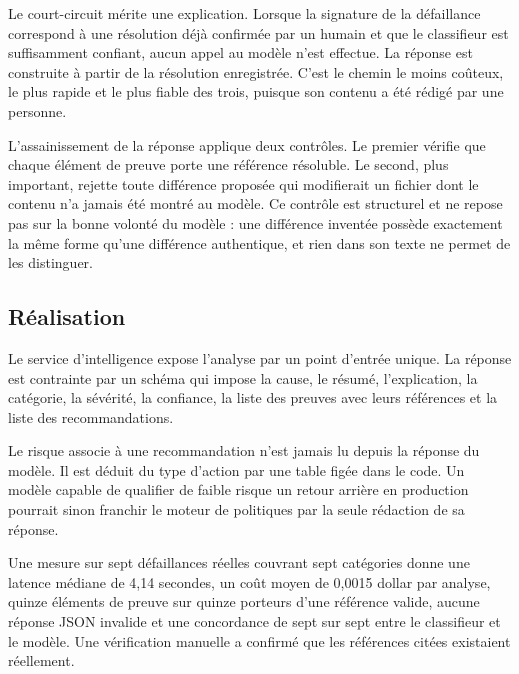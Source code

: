\documentclass[12pt,a4paper,oneside]{report}
\begin{document}
Le court-circuit mérite une explication. Lorsque la signature de la défaillance
correspond à une résolution déjà confirmée par un humain et que le classifieur
est suffisamment confiant, aucun appel au modèle n'est effectue. La réponse est
construite à partir de la résolution enregistrée. C'est le chemin le moins
coûteux, le plus rapide et le plus fiable des trois, puisque son contenu a été
rédigé par une personne.

L'assainissement de la réponse applique deux contrôles. Le premier vérifie que
chaque élément de preuve porte une référence résoluble. Le second, plus
important, rejette toute différence proposée qui modifierait un fichier dont le
contenu n'a jamais été montré au modèle. Ce contrôle est structurel et ne repose
pas sur la bonne volonté du modèle : une différence inventée possède exactement
la même forme qu'une différence authentique, et rien dans son texte ne permet de
les distinguer.

\subsection{Réalisation}

Le service d'intelligence expose l'analyse par un point d'entrée unique. La
réponse est contrainte par un schéma qui impose la cause, le résumé,
l'explication, la catégorie, la sévérité, la confiance, la liste des preuves avec
leurs références et la liste des recommandations.

Le risque associe à une recommandation n'est jamais lu depuis la réponse du
modèle. Il est déduit du type d'action par une table figée dans le code. Un
modèle capable de qualifier de faible risque un retour arrière en production
pourrait sinon franchir le moteur de politiques par la seule rédaction de sa
réponse.

Une mesure sur sept défaillances réelles couvrant sept catégories donne une
latence médiane de 4,14 secondes, un coût moyen de 0,0015 dollar par analyse,
quinze éléments de preuve sur quinze porteurs d'une référence valide, aucune
réponse JSON invalide et une concordance de sept sur sept entre le classifieur et
le modèle. Une vérification manuelle a confirmé que les références citées
existaient réellement.
\end{document}
